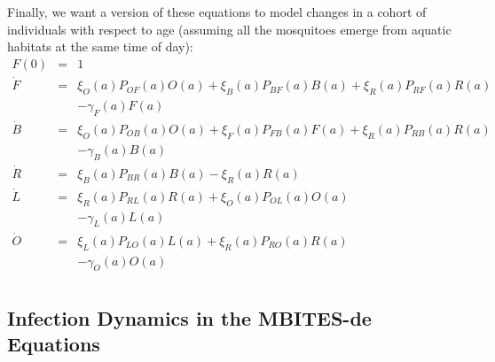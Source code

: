\documentclass{article}
\begin{document}
Finally, we want a version of these equations to model changes in a cohort of individuals with respect to age (assuming all the mosquitoes emerge from aquatic habitats at the same time of day): 
%
\begin{equation}\begin{array}{rcl}
F(0) &=& 1 \\ 
%
{\dot F}&=& 
\xi_O(a) P_{OF}(a) O(a) 
+ \xi_B(a) P_{BF}(a) B(a) 
 + \xi_R(a) P_{RF}(a) R(a)
\\ &&
- \gamma_F(a) F(a) 
 \\ 
%
%
{\dot B} &=&  \xi_O(a) P_{OB}(a) O(a) + \xi_F(a) P_{FB}(a) F(a) 
+ \xi_R(a) P_{RB}(a) R(a) \\ && 
- \gamma_B(a) B(a)
\\
%
{\dot R} &=&  \xi_B(a) P_{BR}(a) B(a) - \xi_R(a) R(a)\\ 
%
{\dot L}&=& \xi_R(a) P_{RL}(a) R(a) + 
\xi_O(a) P_{OL}(a) O(a) \\&&
- \gamma_L(a) L(a)
\\ 
%
{\dot O} &=& \xi_L(a) P_{LO}(a) L(a) 
+ \xi_R(a) P_{RO}(a) R(a)  
\\&& 
- \gamma_O(a) O(a)
\\ 
%
\end{array}\end{equation}

\subsection{Infection Dynamics in the MBITES-de Equations}
\end{document}

